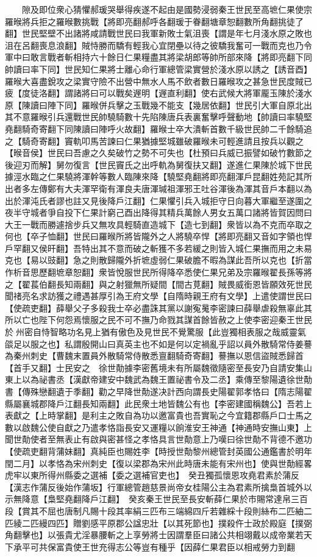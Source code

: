 　　隙及即位衆心猜懼郝瑗哭舉得疾遂不起由是國勢浸弱秦王世民至高墌仁果使宗羅㬋將兵拒之羅㬋數挑戰【將即亮翻郝呼各翻瑗于眷翻塘章恕翻數所角翻挑徒了翻】世民堅壁不出諸將咸請戰世民曰我軍新敗士氣沮喪【謂是年七月淺水原之敗也沮在呂翻喪息浪翻】賊恃勝而驕有輕我心宜閉壘以待之彼驕我奮可一戰而克也乃令軍中曰敢言戰者斬相持六十餘日仁果糧盡其將梁胡郎等帥所部來降【將即亮翻下同帥讀曰率下同】世民知仁果將士離心命行軍總管梁實營於淺水原以誘之【誘音酉】羅㬋大喜盡銳攻之梁實守險不出營中無水人馬不飲者數日羅㬋攻之甚急世民度賊已疲【度徒洛翻】謂諸將曰可以戰矣遟明【遟直利翻】使右武候大將軍龎玉陳於淺水原【陳讀曰陣下同】羅㬋併兵擊之玉戰幾不能支【幾居依翻】世民引大軍自原北出其不意羅㬋引兵還戰世民帥驍騎數十先陷陳唐兵表裏奮擊呼聲動地【帥讀曰率驍堅堯翻騎奇寄翻下同陳讀曰陣呼火故翻】羅㬋士卒大潰斬首數千級世民帥二千餘騎追之【騎奇寄翻】竇軌叩馬苦諫曰仁果猶據堅城雖破羅㬋未可輕進請且按兵以觀之【㬋音侯】世民曰吾慮之久矣破竹之勢不可失也【杜預曰兵威已振譬如破竹數節之後迎刃而解】舅勿復言【世民竇氏之出呼軌為舅復扶又翻】遂進仁果陳於城下世民據涇水臨之仁果驍將渾幹等數人臨陳來降【驍堅堯翻將即亮翻渾戶昆翻姓苑記其所出者多左傳鄭有大夫渾罕衛有渾良夫唐渾瑊祖渾邪王吐谷渾後為渾其音戶本翻以為出於渾沌氏者謬也註又見後降戶江翻】仁果懼引兵入城拒守日向暮大軍繼至遂圍之夜半守城者爭自投下仁果計窮己酉出降得其精兵萬餘人男女五萬口諸將皆賀因問曰大王一戰而勝遽捨步兵又無攻具輕騎直造城下【造七到翻】衆皆以為不克而卒取之何也【卒子恤翻】世民曰羅㬋所將皆隴外之人將驍卒悍【將即亮翻又音如字領也悍戶罕翻又侯旰翻】吾特出其不意而破之斬獲不多若緩之則皆入城仁果撫而用之未易克也【易以豉翻】急之則散歸隴外折墌虛弱仁果破膽不暇為謀此吾所以克也【折當作析音思歷翻墌章恕翻】衆皆悅服世民所得降卒悉使仁果兄弟及宗羅㬋翟長孫等將之【翟萇伯翻長知兩翻】與之射獵無所疑間【間古莧翻】賊畏威銜恩皆願效死世民聞禇亮名求訪獲之禮遇甚厚引為王府文學【自隋時親王府有文學】上遣使謂世民曰【使疏吏翻】薛舉父子多殺我士卒必盡誅其黨以謝寃䰟李密諫曰薛舉虐殺無辜此其所以亡也陛下何怨焉懷服之民不可不撫乃命戮其謀首餘皆赦之上使李密迎秦王世民於州密自恃智略功名見上猶有傲色及見世民不覺驚服【此豈獨相表服之哉威靈氣燄足以服之也】私謂殷開山曰真英主也不如是何以定禍亂乎詔以員外散騎常侍姜謩為秦州刺史【曹魏末置員外散騎常侍散悉亶翻騎奇寄翻】謩撫以恩信盜賊悉歸首【首手又翻】士民安之　徐世勣據李密舊境未有所屬魏徵隨密至長安乃自請安集山東上以為祕書丞【漢獻帝建安中魏武為魏王置祕書令及二丞】乘傳至黎陽遺徐世勣書【傳殊戀翻遺于季翻】勸之早降世勣遂决計西向謂長史陽翟郭孝恪曰【隋志陽翟縣屬襄城郡降戶江翻長知兩翻】此民衆土地皆魏公有也【李密建國稱魏公】吾若上表獻之【上時掌翻】是利主之敗自為功以邀富貴也吾實恥之今宜籍郡縣戶口士馬之數以啟魏公使自獻之乃遣孝恪詣長安又運糧以餉淮安王神通【神通時安撫山東】上聞世勣使者至無表止有啟與密甚怪之孝恪具言世勣意上乃嘆曰徐世勣不背德不邀功【使疏吏翻背蒲妹翻】真純臣也賜姓李【時授世勣黎州總管封英國公通鑑書於明年閏二月】以孝恪為宋州刺史【復以梁郡為宋州此時唐未能有宋州也】使與世勣經畧虎牢以東所得州縣委之選補【委之選補官吏也】　癸丑獨孤懷恩攻堯君素於蒲反【漢志作蒲反後始作蒲坂】行軍總管趙慈景尚帝女桂陽公主為君素所擒梟首城外以示無降意【梟堅堯翻降戶江翻】　癸亥秦王世民至長安斬薛仁果於市賜常達帛三百段【賞其不屈也唐制凡賜十段其率絹三匹布三端綿四斤若雜綵十段則絲布二匹紬二匹綾二匹縵四匹】贈劉感平原郡公諡忠壯【以其死節也】撲殺仵士政於殿庭【撲弼角翻擊也】以張貴尤淫暴腰斬之上享勞將士因謂羣臣曰諸公共相翊戴以成帝業若天下承平可共保富貴使王世充得志公等豈有種乎【因薛仁果君臣以相戒勞力到翻